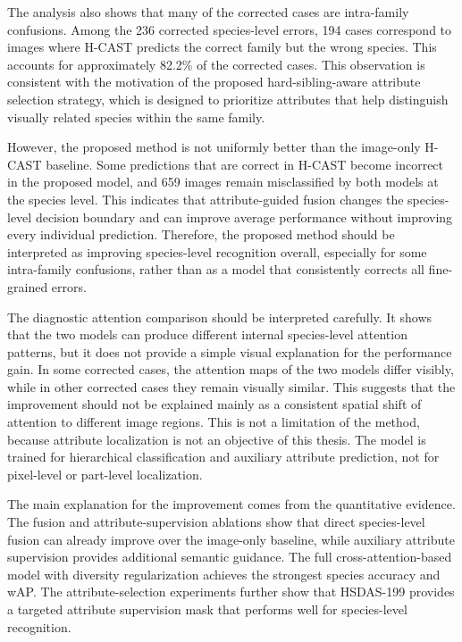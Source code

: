 The analysis also shows that many of the corrected cases are intra-family confusions. Among the 236 corrected species-level errors, 194 cases correspond to images where H-CAST predicts the correct family but the wrong species. This accounts for approximately 82.2\% of the corrected cases. This observation is consistent with the motivation of the proposed hard-sibling-aware attribute selection strategy, which is designed to prioritize attributes that help distinguish visually related species within the same family.

However, the proposed method is not uniformly better than the image-only H-CAST baseline. Some predictions that are correct in H-CAST become incorrect in the proposed model, and 659 images remain misclassified by both models at the species level. This indicates that attribute-guided fusion changes the species-level decision boundary and can improve average performance without improving every individual prediction. Therefore, the proposed method should be interpreted as improving species-level recognition overall, especially for some intra-family confusions, rather than as a model that consistently corrects all fine-grained errors.

The diagnostic attention comparison should be interpreted carefully. It shows that the two models can produce different internal species-level attention patterns, but it does not provide a simple visual explanation for the performance gain. In some corrected cases, the attention maps of the two models differ visibly, while in other corrected cases they remain visually similar. This suggests that the improvement should not be explained mainly as a consistent spatial shift of attention to different image regions. This is not a limitation of the method, because attribute localization is not an objective of this thesis. The model is trained for hierarchical classification and auxiliary attribute prediction, not for pixel-level or part-level localization.

The main explanation for the improvement comes from the quantitative evidence. The fusion and attribute-supervision ablations show that direct species-level fusion can already improve over the image-only baseline, while auxiliary attribute supervision provides additional semantic guidance. The full cross-attention-based model with diversity regularization achieves the strongest species accuracy and wAP. The attribute-selection experiments further show that HSDAS-199 provides a targeted attribute supervision mask that performs well for species-level recognition.

